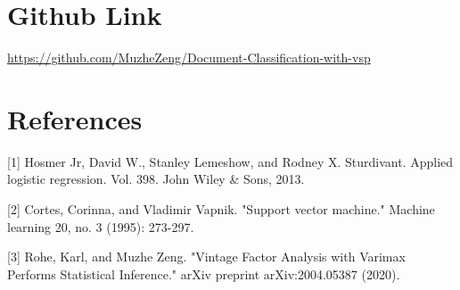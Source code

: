 \documentclass{article}
\begin{document}
\section{Github Link}
\url{https://github.com/MuzheZeng/Document-Classification-with-vsp}


\section*{References}
\medskip
\small

[1] Hosmer Jr, David W., Stanley Lemeshow, and Rodney X. Sturdivant. Applied logistic regression. Vol. 398. John Wiley \& Sons, 2013.

[2] Cortes, Corinna, and Vladimir Vapnik. "Support vector machine." Machine learning 20, no. 3 (1995): 273-297.

[3] Rohe, Karl, and Muzhe Zeng. "Vintage Factor Analysis with Varimax Performs Statistical Inference." arXiv preprint arXiv:2004.05387 (2020).
\end{document}
